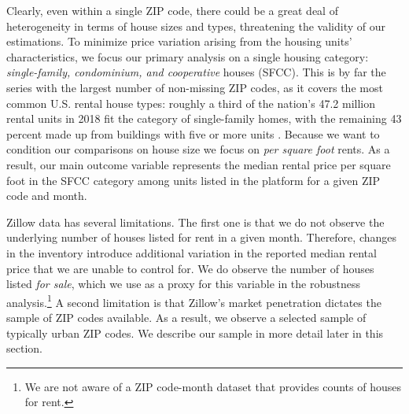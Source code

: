 Clearly, even within a single ZIP code, there could be a great deal of heterogeneity in 
terms of house sizes and types, threatening the validity of our estimations.
To minimize price variation arising from the housing units' characteristics, we focus 
our primary analysis on a single housing category: \textit{single-family, condominium, and 
cooperative} houses (SFCC). This is by far the series with the largest number of 
non-missing ZIP codes, as it covers the most common U.S. rental house types: roughly a third 
of the nation's 47.2 million rental units in 2018 fit the category of single-family homes, 
with the remaining 43 percent made up from buildings with five or more units 
\parencite{fernald2020americas}. Because we want to condition our comparisons on house
size we focus on \textit{per square foot} rents. As a result, our main outcome variable 
represents the median rental price per square foot in the SFCC category among units listed 
in the platform for a given ZIP code and month. 

Zillow data has several limitations. The first one is that we do not observe the 
underlying number of houses listed for rent in a given month. Therefore, changes in the 
inventory introduce additional variation in the reported median rental price that we 
are unable to control for. We do observe the number of houses listed \textit{for sale}, 
which we use as a proxy for this variable in the robustness analysis.\footnote{We are not 
	aware of a ZIP code-month dataset that provides counts of houses for rent.}
A second limitation is that Zillow's market penetration dictates the sample of ZIP codes 
available. As a result, we observe a selected sample of typically urban ZIP codes. We 
describe our sample in more detail later in this section.

